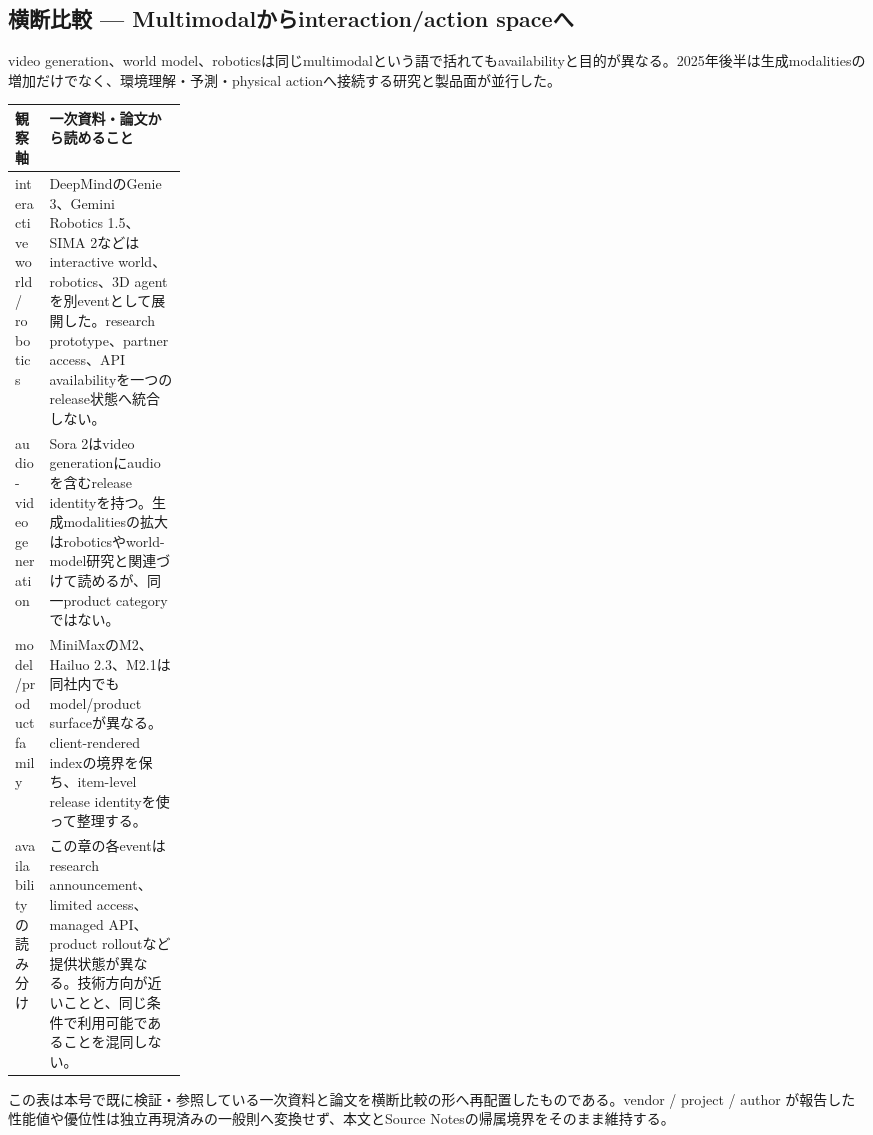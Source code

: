 \subsection*{横断比較 — Multimodalからinteraction/action spaceへ}
video generation、world model、roboticsは同じmultimodalという語で括れてもavailabilityと目的が異なる。2025年後半は生成modalitiesの増加だけでなく、環境理解・予測・physical actionへ接続する研究と製品面が並行した。
\medskip
\begin{center}
\small
\renewcommand{\arraystretch}{1.16}
\begin{tabularx}{\linewidth}{@{}p{0.20\linewidth}X@{}}
\toprule
観察軸 & 一次資料・論文から読めること \\
\midrule
interactive world / robotics & DeepMindのGenie 3、Gemini Robotics 1.5、SIMA 2などはinteractive world、robotics、3D agentを別eventとして展開した。research prototype、partner access、API availabilityを一つのrelease状態へ統合しない。 \cite{src-dd5d9b8662f3} \\
audio-video generation & Sora 2はvideo generationにaudioを含むrelease identityを持つ。生成modalitiesの拡大はroboticsやworld-model研究と関連づけて読めるが、同一product categoryではない。 \cite{src-661a3476d3d5,src-8530f5b0e216} \\
model/product family & MiniMaxのM2、Hailuo 2.3、M2.1は同社内でもmodel/product surfaceが異なる。client-rendered indexの境界を保ち、item-level release identityを使って整理する。 \cite{src-d8e13386974c} \\
availabilityの読み分け & この章の各eventはresearch announcement、limited access、managed API、product rolloutなど提供状態が異なる。技術方向が近いことと、同じ条件で利用可能であることを混同しない。 \cite{src-dd5d9b8662f3,src-661a3476d3d5,src-8530f5b0e216,src-d8e13386974c} \\
\bottomrule
\end{tabularx}
\renewcommand{\arraystretch}{1.0}
\end{center}
\normalsize
\begin{claimboundary}[この比較の境界]
この表は本号で既に検証・参照している一次資料と論文を横断比較の形へ再配置したものである。vendor / project / author が報告した性能値や優位性は独立再現済みの一般則へ変換せず、本文とSource Notesの帰属境界をそのまま維持する。
\end{claimboundary}
